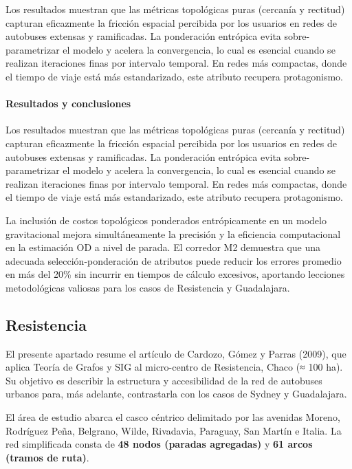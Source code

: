 \documentclass[openany]{book}
\begin{document}
		Los resultados muestran que las métricas topológicas puras (cercanía y rectitud) capturan eficazmente la fricción espacial percibida por los usuarios en redes de autobuses extensas y ramificadas. La ponderación entrópica evita sobre-parametrizar el modelo y acelera la convergencia, lo cual es esencial cuando se realizan iteraciones finas por intervalo temporal. En redes más compactas, donde el tiempo de viaje está más estandarizado, este atributo recupera protagonismo.

		\paragraph{Resultados y conclusiones}
		Los resultados muestran que las métricas topológicas puras (cercanía y rectitud) capturan eficazmente la fricción espacial percibida por los usuarios en redes de autobuses extensas y ramificadas. La ponderación entrópica evita sobre-parametrizar el modelo y acelera la convergencia, lo cual es esencial cuando se realizan iteraciones finas por intervalo temporal. En redes más compactas, donde el tiempo de viaje está más estandarizado, este atributo recupera protagonismo.
		\bigskip

		La inclusión de costos topológicos ponderados entrópicamente en un modelo gravitacional mejora simultáneamente la precisión y la eficiencia computacional en la estimación OD a nivel de parada. El corredor M2 demuestra que una adecuada selección-ponderación de atributos puede reducir los errores promedio en más del 20\% sin incurrir en tiempos de cálculo excesivos, aportando lecciones metodológicas valiosas para los casos de Resistencia y Guadalajara.

		\subsection{Resistencia}

		El presente apartado resume el artículo de Cardozo, Gómez y Parras (2009), que aplica Teoría de Grafos y SIG al micro-centro de Resistencia, Chaco (≈ 100 ha). Su objetivo es describir la estructura y accesibilidad de la red de autobuses urbanos para, más adelante, contrastarla con los casos de Sydney y Guadalajara.

		El área de estudio abarca el casco céntrico delimitado por las avenidas Moreno, Rodríguez Peña, Belgrano, Wilde, Rivadavia, Paraguay, San Martín e Italia. La red simplificada consta de \textbf{48 nodos (paradas agregadas)} y \textbf{61 arcos (tramos de ruta)}.
\end{document}
